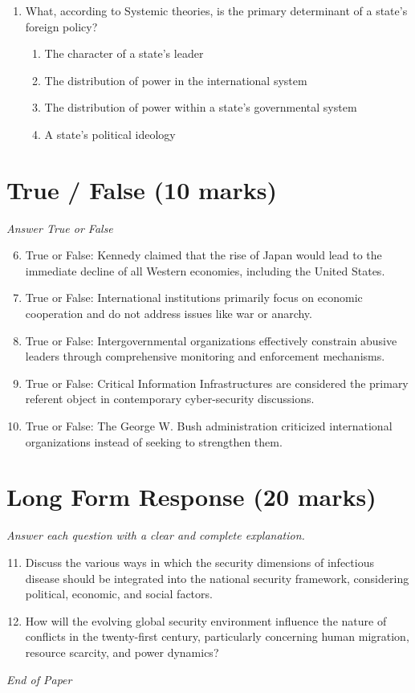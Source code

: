 \documentclass[12pt]{article}
\begin{document}
\begin{enumerate}[label=\arabic*.]
\begin{enumerate}[label=(\alph*)]
    \item Computer networks
\end{enumerate}
\item What, according to Systemic theories, is the primary determinant of a state's foreign policy?
\begin{enumerate}[label=(\alph*)]
    \item The character of a state's leader
    \item The distribution of power in the international system
    \item The distribution of power within a state's governmental system
    \item A state's political ideology
\end{enumerate}
\end{enumerate}

\section*{True / False (10 marks)}
\textit{Answer True or False}
\begin{enumerate}[label=\arabic*.]
\setcounter{enumi}{5}
\item True or False: Kennedy claimed that the rise of Japan would lead to the immediate decline of all Western economies, including the United States.
\item True or False: International institutions primarily focus on economic cooperation and do not address issues like war or anarchy.
\item True or False: Intergovernmental organizations effectively constrain abusive leaders through comprehensive monitoring and enforcement mechanisms.
\item True or False: Critical Information Infrastructures are considered the primary referent object in contemporary cyber-security discussions.
\item True or False: The George W. Bush administration criticized international organizations instead of seeking to strengthen them.
\end{enumerate}

\section*{Long Form Response (20 marks)}
\textit{Answer each question with a clear and complete explanation.}
\begin{enumerate}[label=\arabic*.]
\setcounter{enumi}{10}
\item Discuss the various ways in which the security dimensions of infectious disease should be integrated into the national security framework, considering political, economic, and social factors.
\item How will the evolving global security environment influence the nature of conflicts in the twenty-first century, particularly concerning human migration, resource scarcity, and power dynamics?
\end{enumerate}

\vfill
\noindent\textit{End of Paper}
\end{document}
